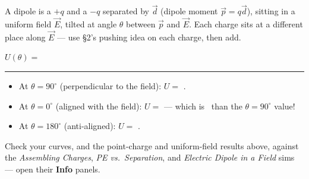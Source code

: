 \documentclass[12pt]{article}
\newcommand{\eqline}[2][-0.5mm]{%
  \par\vspace{1mm}\noindent #2\par\vspace{#1}%
  \noindent\textcolor{rulehue}{\rule{\linewidth}{0.5pt}}\par\vspace{4mm}%
}
\begin{document}
A dipole is a $+q$ and a $-q$ separated by $\vec d$ (dipole moment
$\vec p = q\vec d$), sitting in a uniform field $\vec E$, tilted at angle
$\theta$ between $\vec p$ and $\vec E$. Each charge sits at a different
place along $\vec E$ --- use \S2's pushing idea on each charge, then add.

\vspace{7cm}

\eqline{$U(\theta) = $}

\begin{itemize}[itemsep=9pt,parsep=4pt,topsep=4pt]
\item At $\theta=90^\circ$ (perpendicular to the field): $U=$ \bl[2.4cm].
\item At $\theta=0^\circ$ (aligned with the field): $U=$ \bl[3.2cm] ---
which is \bl[2.4cm]\ than the $\theta=90^\circ$ value!
\item At $\theta=180^\circ$ (anti-aligned): $U=$ \bl[3.2cm].
\end{itemize}



\begin{center}
\end{center}

{\small\color{blankink} Check your curves, and the point-charge and
uniform-field results above, against the \emph{Assembling Charges},
\emph{PE vs.\ Separation}, and \emph{Electric Dipole in a Field} sims ---
open their \textbf{Info} panels.}
\end{document}
